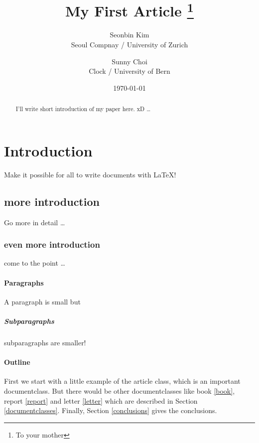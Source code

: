 \documentclass[12pt, a4paper, twoside, titlepage]{article}
\title{My First Article \thanks{To your mother}}
\author{Seonbin Kim  \\
	Seoul Compnay / University of Zurich  \\
	\and
	Sunny Choi \\
	Clock / University of Bern \\
	}
\date{\today}
\begin{document}

\maketitle




\begin{abstract}
I'll write short introduction of my paper here. xD \ldots
\end{abstract}




\section{Introduction}
Make it possible for all to write documents with \LaTeX{}!

\subsection{more introduction}
Go more in detail \ldots

\subsubsection{even more introduction}
come to the point \ldots

\paragraph{Paragraphs}
A paragraph is small but

\subparagraph{Subparagraphs}
subparagraphs are smaller!

\paragraph{Outline}
First we start with a little example of the article class, which is an
important documentclass. But there would be other documentclasses like
book \ref{book}, report \ref{report} and letter \ref{letter} which are
described in Section \ref{documentclasses}. Finally, Section
\ref{conclusions} gives the conclusions.
\end{document}

